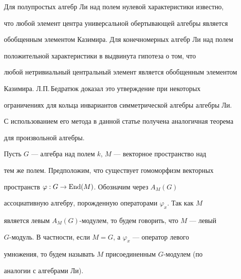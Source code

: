 

\pagestyle{plain} %


 




\maketitle 


\label{begin} 


 


 


Для полупростых алгебр Ли над полем нулевой характеристики известно,


что любой элемент центра универсальной обертывающей алгебры является 


обобщенным элементом Казимира. Для конечномерных алгебр Ли над полем 


положительной характеристики в \cite{1} выдвинута гипотеза о том, что 


любой нетривиальный центральный элемент является обобщенным элементом 


Казимира. Л.П.\,Бедратюк \cite{2} доказал это утверждение при некоторых 


ограничениях для кольца инвариантов симметрической алгебры алгебры Ли. 


С использованием его метода в данной статье получена аналогичная теорема


для произвольной алгебры. 


 


Пусть $G$ --- алгебра над полем $k$, $M$ --- векторное пространство над 


тем же полем. Предположим, что существует гомоморфизм векторных 


пространств $\varphi:G\to\operatorname{End}(M)$. Обозначим через $A_M(G)$ 


ассоциативную алгебру, порожденную операторами $\varphi_x$. Так как $M$ 


является левым $A_M(G)$-модулем, то будем говорить, что $M$ --- левый 


$G$-модуль. В частности, если $M=G$, а $\varphi_x$ --- оператор левого 


умножения, то будем называть $M$ присоединенным $G$-модулем (по 


аналогии с алгебрами Ли). 


